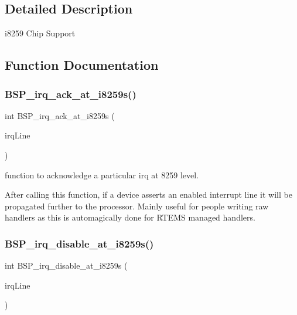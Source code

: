 \subsection{Detailed Description}
i8259 Chip Support 



\subsection{Function Documentation}
\mbox{\label{group__mips__i8259__irq_ga71748a7cd08c833484dc27fe32dafeb5}} 
\subsubsection{\texorpdfstring{BSP\_irq\_ack\_at\_i8259s()}{BSP\_irq\_ack\_at\_i8259s()}}
{\footnotesize\ttfamily int B\+S\+P\+\_\+irq\+\_\+ack\+\_\+at\+\_\+i8259s (\begin{DoxyParamCaption}\item[{const rtems\+\_\+irq\+\_\+number}]{irq\+Line }\end{DoxyParamCaption})}



function to acknowledge a particular irq at 8259 level. 

After calling this function, if a device asserts an enabled interrupt line it will be propagated further to the processor. Mainly useful for people writing raw handlers as this is automagically done for R\+T\+E\+MS managed handlers. \mbox{\label{group__mips__i8259__irq_ga2cbf3b2287a4937b96bacd73ce4ce3c7}} 
\subsubsection{\texorpdfstring{BSP\_irq\_disable\_at\_i8259s()}{BSP\_irq\_disable\_at\_i8259s()}}
{\footnotesize\ttfamily int B\+S\+P\+\_\+irq\+\_\+disable\+\_\+at\+\_\+i8259s (\begin{DoxyParamCaption}\item[{const rtems\+\_\+irq\+\_\+number}]{irq\+Line }\end{DoxyParamCaption})}




